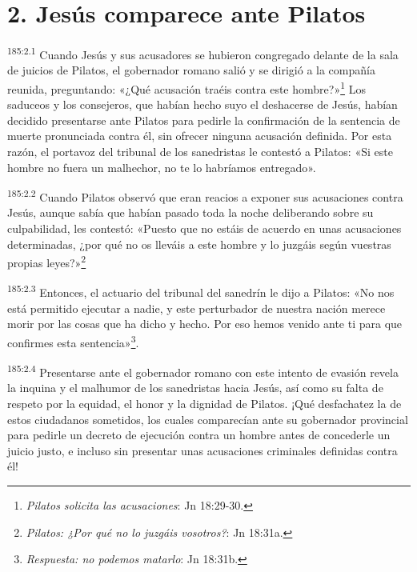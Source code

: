 \section*{2. Jesús comparece ante Pilatos}
\par
\textsuperscript{185:2.1} Cuando Jesús y sus acusadores se hubieron congregado delante de la sala de juicios de Pilatos, el gobernador romano salió y se dirigió a la compañía reunida, preguntando: «¿Qué acusación traéis contra este hombre?»\footnote{\textit{Pilatos solicita las acusaciones}: Jn 18:29-30.} Los saduceos y los consejeros, que habían hecho suyo el deshacerse de Jesús, habían decidido presentarse ante Pilatos para pedirle la confirmación de la sentencia de muerte pronunciada contra él, sin ofrecer ninguna acusación definida. Por esta razón, el portavoz del tribunal de los sanedristas le contestó a Pilatos: «Si este hombre no fuera un malhechor, no te lo habríamos entregado».

\par
\textsuperscript{185:2.2} Cuando Pilatos observó que eran reacios a exponer sus acusaciones contra Jesús, aunque sabía que habían pasado toda la noche deliberando sobre su culpabilidad, les contestó: «Puesto que no estáis de acuerdo en unas acusaciones determinadas, ¿por qué no os lleváis a este hombre y lo juzgáis según vuestras propias leyes?»\footnote{\textit{Pilatos: ¿Por qué no lo juzgáis vosotros?}: Jn 18:31a.}

\par
\textsuperscript{185:2.3} Entonces, el actuario del tribunal del sanedrín le dijo a Pilatos: «No nos está permitido ejecutar a nadie, y este perturbador de nuestra nación merece morir por las cosas que ha dicho y hecho. Por eso hemos venido ante ti para que confirmes esta sentencia»\footnote{\textit{Respuesta: no podemos matarlo}: Jn 18:31b.}.

\par
\textsuperscript{185:2.4} Presentarse ante el gobernador romano con este intento de evasión revela la inquina y el malhumor de los sanedristas hacia Jesús, así como su falta de respeto por la equidad, el honor y la dignidad de Pilatos. ¡Qué desfachatez la de estos ciudadanos sometidos, los cuales comparecían ante su gobernador provincial para pedirle un decreto de ejecución contra un hombre antes de concederle un juicio justo, e incluso sin presentar unas acusaciones criminales definidas contra él!

